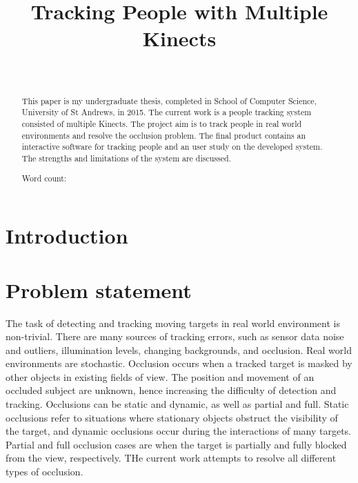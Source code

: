 \documentclass{sigchi}
\begin{document}
\title{Tracking People with Multiple Kinects}

\author{%
  \\
}

\maketitle

\begin{abstract}
This paper is my undergraduate thesis, completed in School of Computer Science, University of St Andrews, in 2015. The current work is a people tracking system consisted of multiple Kinects. The project aim is to track people in real world environments and resolve the occlusion problem. The final product contains an interactive software for tracking people and an user study on the developed system. The strengths and limitations of the system are discussed.

Word count: 
\end{abstract}



\section{Introduction}
\label{sec:introduction}


\section{Problem statement}
\label{sec:problem_statement}

The task of detecting and tracking moving targets in real world environment is non-trivial. There are many sources of tracking errors, such as sensor data noise and outliers, illumination levels, changing backgrounds, and occlusion. Real world environments are stochastic. Occlusion occurs when a tracked target is masked by other objects in existing fields of view. The position and movement of an occluded subject are unknown, hence increasing the difficulty of detection and tracking. Occlusions can be static and dynamic, as well as partial and full. Static occlusions refer to situations where stationary objects obstruct the visibility of the target, and dynamic occlusions occur during the interactions of many targets. Partial and full occlusion cases are when the target is partially and fully blocked from the view, respectively. THe current work attempts to resolve all different types of occlusion.
\end{document}

